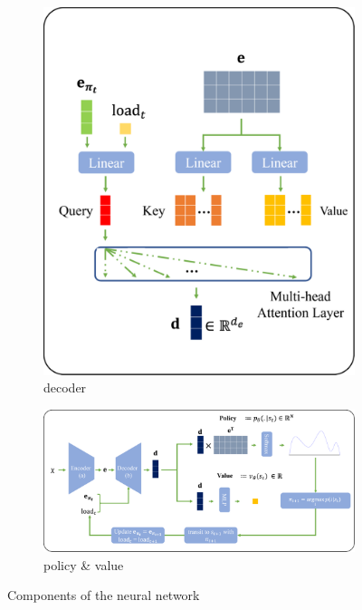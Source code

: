 \documentclass{article}
\begin{document}
\begin{figure}
\begin{center}
\begin{subfigure}[b]{0.45\linewidth}
            \centering
             \includegraphics[width=\linewidth]{figures/decoder.png}
             \caption{decoder}
             \label{fig:nn-decoder}
        \end{subfigure}
    \end{center}

    \centering
    \begin{subfigure}[b]{0.95\linewidth}
         \includegraphics[width=\linewidth]{figures/policy and value - integrated.png}
         \caption{policy \& value}
         \label{fig:nn-policy_and_value}
    \end{subfigure}
    \caption{Components of the neural network}
    \label{fig:neural net components}
\end{figure}
\end{document}
